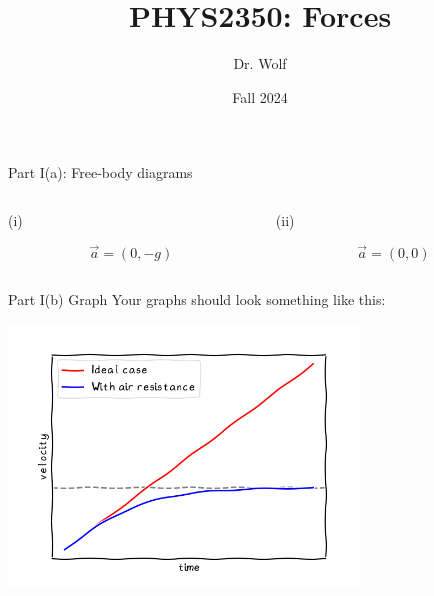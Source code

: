 \documentclass{beamer}
\title{PHYS2350: Forces}
\author{Dr. Wolf}
\date{Fall 2024}
\begin{document}
\begin{frame}
  \titlepage
\end{frame}

\begin{frame}
  {Part \textrm{I}(a): Free-body diagrams}
  \begin{columns}
    \begin{column}{0.5\textwidth}
      (i)
      \begin{center}
      \end{center}
      \[
        \vec{a} = (0,-g)
      \]
    \end{column}
    \begin{column}{0.5\textwidth}
      (ii)
      \begin{center}
      \end{center}
      \[
        \vec{a} = (0,0)
      \]
    \end{column}
  \end{columns}
\end{frame}

\begin{frame}
  {Part \textrm{I}(b) Graph}
  Your graphs should look something like this:
  \begin{center}
    \includegraphics[width=0.7\textwidth]{velTimePlot.png}
  \end{center}
\end{frame}
\end{document}
